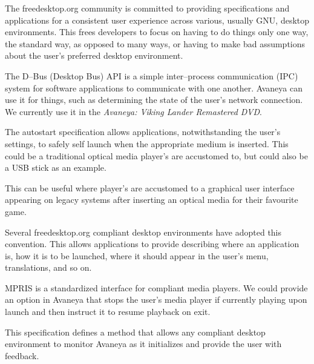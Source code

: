 

The freedesktop.org community is committed to providing specifications and applications for a consistent user experience across various, usually GNU, desktop environments. This frees developers to focus on having to do things only one way, the standard way, as opposed to many ways, or having to make bad assumptions about the user's preferred desktop environment. 


\startitemize[4]

The D--Bus (Desktop Bus) API is a simple inter--process communication (IPC) system for software applications to communicate with one another. Avaneya can use it for things, such as determining the state of the user's network connection. We currently use it in the {\it Avaneya: Viking Lander Remastered DVD}.


The autostart specification allows applications, notwithstanding the user's settings, to safely self launch when the appropriate medium is inserted. This could be a traditional optical media player's are accustomed to, but could also be a USB stick as an example. 

This can be useful where player's are accustomed to a graphical user interface appearing on legacy systems after inserting an optical media for their favourite game.


Several freedesktop.org compliant desktop environments have adopted this convention. This allows applications to provide  describing where an application is, how it is to be launched, where it should appear in the user's menu, translations, and so on.


MPRIS is a standardized interface for compliant media players. We could provide an option in Avaneya that stops the user's media player if currently playing upon launch and then instruct it to resume playback on exit.


This specification defines a method that allows any compliant desktop environment to monitor Avaneya as it initializes and provide the user with feedback.
\stopitemize

